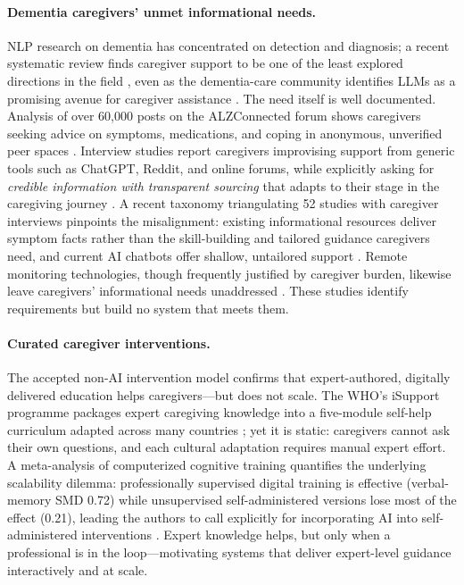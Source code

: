 \paragraph{Dementia caregivers' unmet informational needs.}
NLP research on dementia has concentrated on detection and diagnosis;
a recent systematic review finds caregiver support to be one of the least
explored directions in the field \citep{nlpdementia2025}, even as the
dementia-care community identifies LLMs as a promising avenue for caregiver
assistance \citep{llmdementia2024}. The need itself is well documented.
Analysis of over 60,000 posts on the ALZConnected forum shows caregivers
seeking advice on symptoms, medications, and coping in anonymous,
unverified peer spaces \citep{forumanalysis2024}. Interview studies report
caregivers improvising support from generic tools such as ChatGPT, Reddit,
and online forums, while explicitly asking for \emph{credible information
with transparent sourcing} that adapts to their stage in the caregiving
journey \citep{balancing2025}. A recent taxonomy triangulating 52 studies
with caregiver interviews pinpoints the misalignment: existing
informational resources deliver symptom facts rather than the
skill-building and tailored guidance caregivers need, and current AI
chatbots offer shallow, untailored support \citep{taxonomy2026}. Remote
monitoring technologies, though frequently justified by caregiver burden,
likewise leave caregivers' informational needs unaddressed
\citep{remotemonitoring2025}. These studies identify requirements but
build no system that meets them.

\paragraph{Curated caregiver interventions.}
The accepted non-AI intervention model confirms that expert-authored,
digitally delivered education helps caregivers---but does not scale.
The WHO's iSupport programme packages expert caregiving knowledge into a
five-module self-help curriculum adapted across many countries
\citep{isupport}; yet it is static: caregivers cannot ask their own
questions, and each cultural adaptation requires manual expert effort.
A meta-analysis of computerized cognitive training quantifies the
underlying scalability dilemma: professionally supervised digital training
is effective (verbal-memory SMD 0.72) while unsupervised self-administered
versions lose most of the effect (0.21), leading the authors to call
explicitly for incorporating AI into self-administered interventions
\citep{cct2024}. Expert knowledge helps, but only when a professional is
in the loop---motivating systems that deliver expert-level guidance
interactively and at scale.

